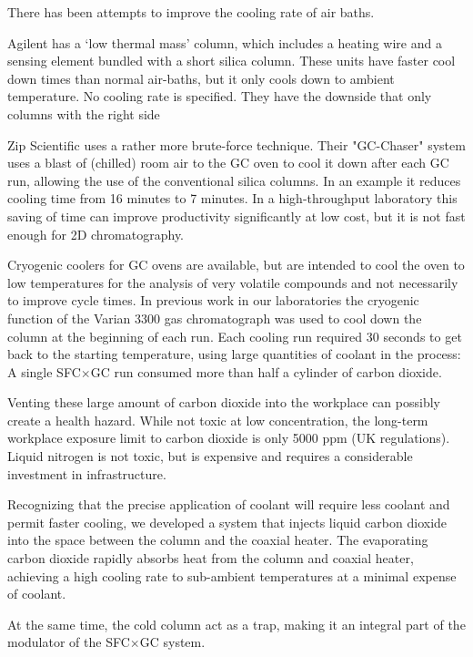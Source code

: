 \documentclass[aip,rsi,preprint,graphicx]{revtex4-1} %
\begin{document}
There has been attempts to improve the cooling rate of air baths.

Agilent has a `low thermal mass' column, which includes a heating wire and a sensing element bundled with a short silica column. These units have faster cool down times than normal air-baths, but it only cools down to ambient temperature. No cooling rate is specified. They have the downside that only columns with the right side

Zip Scientific uses a rather more brute-force technique. Their "GC-Chaser" system\cite{ZipScientific} uses a blast of (chilled) room air to the GC oven to cool it down after each GC run, allowing the use of the conventional silica columns. In an example it reduces cooling time from 16 minutes to 7 minutes. In a high-throughput laboratory this saving of time can improve productivity significantly at low cost, but it is not fast enough for 2D chromatography. 

Cryogenic coolers for GC ovens are available, but are intended to cool the oven to low temperatures for the analysis of very volatile compounds and not necessarily to improve cycle times. In previous work in our laboratories\cite{Venter2004, Venter2006} the cryogenic function of the Varian 3300 gas chromatograph was used to cool down the column at the beginning of each run. Each cooling run required 30 seconds to get back to the starting temperature, using large quantities of coolant in the process: A single SFC$\times$GC run consumed more than half a cylinder of carbon dioxide.

Venting these large amount of carbon dioxide into the workplace can possibly create a health hazard. While not toxic at low concentration, the long-term workplace exposure limit to carbon dioxide is only 5000 ppm (UK regulations\cite{HSE40}). Liquid nitrogen is not toxic, but is expensive and requires a considerable investment in infrastructure. 

Recognizing that the precise application of coolant will require less coolant and permit faster cooling, we developed a system that injects liquid carbon dioxide into the space between the column and the coaxial heater. The evaporating carbon dioxide rapidly absorbs heat from the column and coaxial heater, achieving a high cooling rate to sub-ambient temperatures at a minimal expense of coolant. 

At the same time, the cold column act as a trap, making it an integral part of the modulator of the SFC$\times$GC system. 
\end{document}
